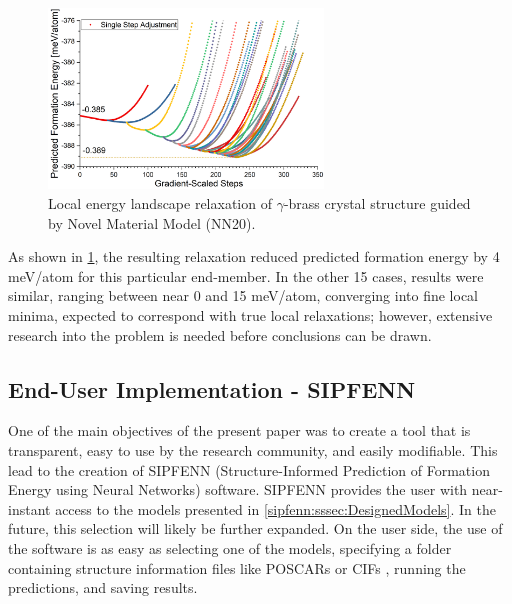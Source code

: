 \begin{figure}[H]
    \centering
    \includegraphics[width=0.65\textwidth]{sipfenn/localRelaxation_6.png}
    \caption{Local energy landscape relaxation of  $\gamma$-brass crystal structure guided by Novel Material Model (NN20).}
    \label{sipfenn:fig:localrelaxationpdzn}
    \vspace{-12pt}
\end{figure}

As shown in \ref{sipfenn:fig:localrelaxationpdzn}, the resulting relaxation reduced predicted formation energy by 4 meV/atom for this particular end-member. In the other 15 cases, results were similar, ranging between near 0 and 15 meV/atom, converging into fine local minima, expected to correspond with true local relaxations; however, extensive research into the problem is needed before conclusions can be drawn.


\subsection{End-User Implementation - SIPFENN} \label{sipfenn:ssec:SIPFENN}

One of the main objectives of the present paper was to create a tool that is transparent, easy to use by the research community, and easily modifiable. This lead to the creation of SIPFENN (Structure-Informed Prediction of Formation Energy using Neural Networks) software. SIPFENN provides the user with near-instant access to the models presented in \ref{sipfenn:sssec:DesignedModels}. In the future, this selection will likely be further expanded. On the user side, the use of the software is as easy as selecting one of the models, specifying a folder containing structure information files like POSCARs \cite{POSCARFile} or CIFs \cite{Hall1991TheCrystallography}, running the predictions, and saving results.

